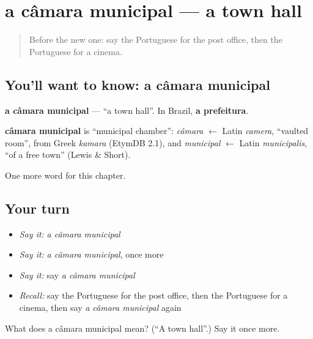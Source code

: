 \section[a câmara municipal]{a câmara municipal — a town hall}

\label{lesson:PT-C85-camara-municipal}



\begin{quote}
Before the new one: say the Portuguese for the post office, then the Portuguese for a cinema.
\end{quote}

\subsection*{You'll want to know: a câmara municipal}
\textbf{a câmara municipal} — \textquotedblleft{}a town hall\textquotedblright{}. In Brazil, \textbf{a prefeitura}.

\begin{cousinweb}
\textbf{câmara municipal} is \textquotedblleft{}municipal chamber\textquotedblright{}: \emph{câmara} $\leftarrow$ Latin \emph{camera}, \textquotedblleft{}vaulted room\textquotedblright{}, from Greek \emph{kamara} (EtymDB 2.1), and \emph{municipal} $\leftarrow$ Latin \emph{municipalis}, \textquotedblleft{}of a free town\textquotedblright{} (Lewis \& Short).
\end{cousinweb}

\begin{grammarlens}[title={What you've built}]
One more word for this chapter.
\end{grammarlens}

\subsection*{Your turn}
\begin{itemize}
\raggedright
  \item \emph{Say it:} \emph{a câmara municipal}
  \item \emph{Say it:} \emph{a câmara municipal}, once more
  \item \emph{Say it:} say \emph{a câmara municipal}
  \item \emph{Recall:} say the Portuguese for the post office, then the Portuguese for a cinema, then say \emph{a câmara municipal} again
\end{itemize}

\begin{tcolorbox}[breakable,colback=teal!4,colframe=teal!35!black,title={Before you move on}]
What does a câmara municipal mean? (\textquotedblleft{}A town hall\textquotedblright{}.) Say it once more.
\end{tcolorbox}
